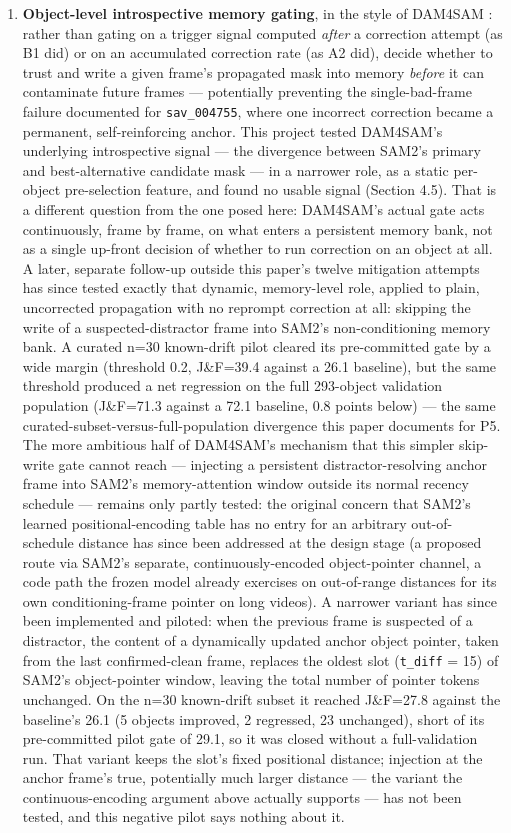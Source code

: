 \documentclass[11pt]{article}
\begin{document}
\begin{enumerate}
\item \textbf{Object-level introspective memory gating}, in the style of DAM4SAM \citep{videnovic2024}: rather than gating on a trigger signal computed \emph{after} a correction attempt (as B1 did) or on an accumulated correction rate (as A2 did), decide whether to trust and write a given frame's propagated mask into memory \emph{before} it can contaminate future frames — potentially preventing the single-bad-frame failure documented for \texttt{sav\_004755}, where one incorrect correction became a permanent, self-reinforcing anchor. This project tested DAM4SAM's underlying introspective signal — the divergence between SAM2's primary and best-alternative candidate mask — in a narrower role, as a static per-object pre-selection feature, and found no usable signal (Section 4.5). That is a different question from the one posed here: DAM4SAM's actual gate acts continuously, frame by frame, on what enters a persistent memory bank, not as a single up-front decision of whether to run correction on an object at all. A later, separate follow-up outside this paper's twelve mitigation attempts has since tested exactly that dynamic, memory-level role, applied to plain, uncorrected propagation with no reprompt correction at all: skipping the write of a suspected-distractor frame into SAM2's non-conditioning memory bank. A curated n=30 known-drift pilot cleared its pre-committed gate by a wide margin (threshold 0.2, J\&F=39.4 against a 26.1 baseline), but the same threshold produced a net regression on the full 293-object validation population (J\&F=71.3 against a 72.1 baseline, 0.8 points below) — the same curated-subset-versus-full-population divergence this paper documents for P5. The more ambitious half of DAM4SAM's mechanism that this simpler skip-write gate cannot reach — injecting a persistent distractor-resolving anchor frame into SAM2's memory-attention window outside its normal recency schedule — remains only partly tested: the original concern that SAM2's learned positional-encoding table has no entry for an arbitrary out-of-schedule distance has since been addressed at the design stage (a proposed route via SAM2's separate, continuously-encoded object-pointer channel, a code path the frozen model already exercises on out-of-range distances for its own conditioning-frame pointer on long videos). A narrower variant has since been implemented and piloted: when the previous frame is suspected of a distractor, the content of a dynamically updated anchor object pointer, taken from the last confirmed-clean frame, replaces the oldest slot (\texttt{t\_diff} = 15) of SAM2's object-pointer window, leaving the total number of pointer tokens unchanged. On the n=30 known-drift subset it reached J\&F=27.8 against the baseline's 26.1 (5 objects improved, 2 regressed, 23 unchanged), short of its pre-committed pilot gate of 29.1, so it was closed without a full-validation run. That variant keeps the slot's fixed positional distance; injection at the anchor frame's true, potentially much larger distance — the variant the continuous-encoding argument above actually supports — has not been tested, and this negative pilot says nothing about it.

\end{enumerate}
\end{document}
